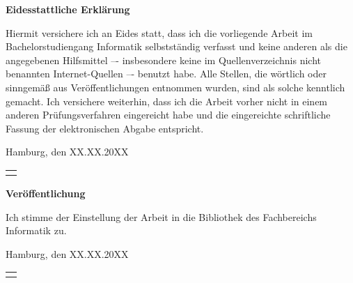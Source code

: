 
\clearpage
\thispagestyle{empty}
\pagestyle{empty}

\begin{center}
	\Large
	\textbf{Eidesstattliche Erklärung}
\end{center}
\noindent
Hiermit versichere ich an Eides statt, dass ich die vorliegende Arbeit im Bachelorstudiengang Informatik selbstständig verfasst und keine anderen als die angegebenen Hilfsmittel –- insbesondere keine im Quellenverzeichnis nicht benannten Internet-Quellen –- benutzt habe. Alle Stellen, die wörtlich oder sinngemäß aus Veröffentlichungen entnommen wurden, sind als solche kenntlich gemacht. Ich versichere weiterhin, dass ich die Arbeit vorher nicht in einem anderen Prüfungsverfahren eingereicht habe und die eingereichte schriftliche Fassung der elektronischen Abgabe entspricht.

\vspace*{1.5cm}
\noindent
Hamburg, den XX.XX.20XX
\hspace*{\fill}
\begin{tabular}{@{}l@{}}
	\hline
	\makebox[5cm]{Hauke Stieler}
\end{tabular}

\vspace*{3cm}

\begin{center}
	\Large
	\textbf{Veröffentlichung}
\end{center}
\noindent
Ich stimme der Einstellung der Arbeit in die Bibliothek des Fachbereichs Informatik zu.

\vspace*{1.5cm}
\noindent
Hamburg, den XX.XX.20XX
\hspace*{\fill}
\begin{tabular}{@{}l@{}}
	\hline
	\makebox[5cm]{Hauke Stieler}
\end{tabular}